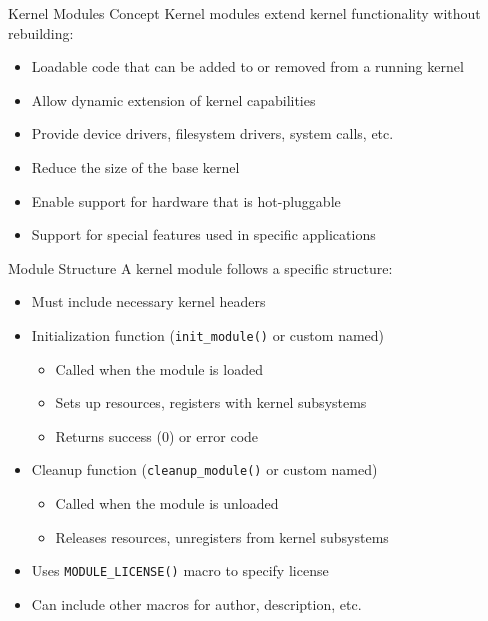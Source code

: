 \begin{definition}{Kernel Modules Concept}
    Kernel modules extend kernel functionality without rebuilding:
    \begin{itemize}
        \item Loadable code that can be added to or removed from a running kernel
        \item Allow dynamic extension of kernel capabilities
        \item Provide device drivers, filesystem drivers, system calls, etc.
        \item Reduce the size of the base kernel
        \item Enable support for hardware that is hot-pluggable
        \item Support for special features used in specific applications
    \end{itemize}
\end{definition}

\begin{definition}{Module Structure}
    A kernel module follows a specific structure:
    \begin{itemize}
        \item Must include necessary kernel headers
        \item Initialization function (\texttt{init\_module()} or custom named)
            \begin{itemize}
                \item Called when the module is loaded
                \item Sets up resources, registers with kernel subsystems
                \item Returns success (0) or error code
            \end{itemize}
        \item Cleanup function (\texttt{cleanup\_module()} or custom named)
            \begin{itemize}
                \item Called when the module is unloaded
                \item Releases resources, unregisters from kernel subsystems
            \end{itemize}
        \item Uses \texttt{MODULE\_LICENSE()} macro to specify license
        \item Can include other macros for author, description, etc.
    \end{itemize}
\end{definition}

